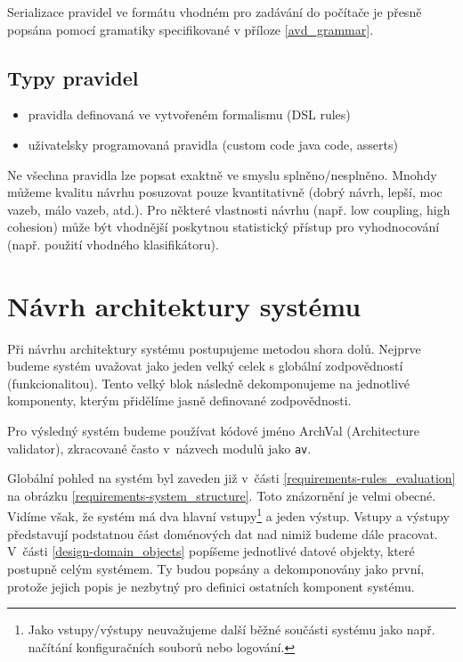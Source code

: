
Serializace pravidel ve formátu vhodném pro zadávání do počítače je přesně popsána pomocí gramatiky specifikované v příloze \ref{avd_grammar}.

\subsection{Typy pravidel}
\begin{itemize}
\item pravidla definovaná ve vytvořeném formalismu (DSL rules)
\item uživatelsky programovaná pravidla (custom code java code, asserts)
\end{itemize}

Ne všechna pravidla lze popsat exaktně ve smyslu splněno/nesplněno. Mnohdy můžeme kvalitu návrhu posuzovat pouze kvantitativně (dobrý návrh, lepší, moc vazeb, málo vazeb, atd.). Pro některé vlastnosti návrhu (např. low coupling, high cohesion) může být vhodnější poskytnou statistický přístup pro vyhodnocování (např. použití vhodného klasifikátoru).

\section{Návrh architektury systému}
\label{design-architecture}


Při návrhu architektury systému postupujeme metodou shora dolů. Nejprve budeme systém uvažovat jako jeden velký celek s globální zodpovědností (funkcionalitou). Tento velký blok následně dekomponujeme na jednotlivé komponenty, kterým přidělíme jasně definované zodpovědnosti.

Pro výsledný systém budeme používat kódové jméno ArchVal (Architecture validator), zkracované často v~názvech modulů jako \verb+av+.

Globální pohled na systém byl zaveden již v~části \ref{requirements-rules_evaluation} na obrázku \ref{requirements-system_structure}. Toto znázornění je velmi obecné. Vidíme však, že systém má dva hlavní vstupy\footnote{Jako vstupy/výstupy neuvažujeme další běžné součásti systému jako např. načítání konfiguračních souborů nebo logování.} a jeden výstup. Vstupy a výstupy představují podstatnou část doménových dat nad nimiž budeme dále pracovat. V~části \ref{design-domain_objects} popíšeme jednotlivé datové objekty, které postupně  celým systémem. Ty budou popsány a dekomponovány jako první, protože jejich popis je nezbytný pro definici ostatních komponent systému.


